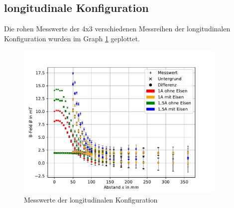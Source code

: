 \documentclass[11pt, a4paper]{article}
\begin{document}
    \subsection{longitudinale Konfiguration}
    Die rohen Messwerte der 4x3 verschiedenen Messreihen der longitudinalen Konfiguration wurden im Graph \ref{fig:longmess} geplottet.
    \begin{figure}[h]
        \centering
        \includegraphics[width=0.9\textwidth]{raw1.pdf}
        \caption{Messwerte der longitudinalen Konfiguration}
        \label{fig:longmess}
    \end{figure}
\end{document}

